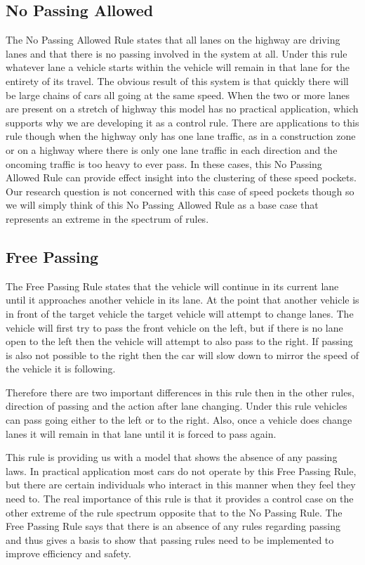 \documentclass{amsart}
\begin{document}
	\subsection{No Passing Allowed}
	The No Passing Allowed Rule states that all lanes on the highway are driving lanes and that there is no passing involved in the system at all.  Under this rule whatever lane a vehicle starts within the vehicle will remain in that lane for the entirety of its travel.  The obvious result of this system is that quickly there will be large chains of cars all going at the same speed.  When the two or more lanes are present on a stretch of highway this model has no practical application, which supports why we are developing it as a control rule.  There are applications to this rule though when the highway only has one lane traffic, as in a construction zone or on a highway where there is only one lane traffic in each direction and the oncoming traffic is too heavy to ever pass.  In these cases, this No Passing Allowed Rule can provide effect insight into the clustering of these speed pockets.  Our research question is not concerned with this case of speed pockets though so we will simply think of this No Passing Allowed Rule as a base case that represents an extreme in the spectrum of rules.  
	\subsection{Free Passing}
	The Free Passing Rule states that the vehicle will continue in its current lane until it approaches another vehicle in its lane.  At the point that another vehicle is in front of the target vehicle the target vehicle will attempt to change lanes.  The vehicle will first try to pass the front vehicle on the left, but if there is no lane open to the left then the vehicle will attempt to also pass to the right.  If passing is also not possible to the right then the car will slow down to mirror the speed of the vehicle it is following. 

	Therefore there are two important differences in this rule then in the other rules, direction of passing and the action after lane changing.  Under this rule vehicles can pass going either to the left or to the right.  Also, once a vehicle does change lanes it will remain in that lane until it is forced to pass again.  

	This rule is providing us with a model that shows the absence of any passing laws.  In practical application most cars do not operate by this Free Passing Rule, but there are certain individuals who interact in this manner when they feel they need to.  The real importance of this rule is that it provides a control case on the other extreme of the rule spectrum opposite that to the No Passing Rule.  The Free Passing Rule says that there is an absence of any rules regarding passing and thus gives a basis to show that passing rules need to be implemented to improve efficiency and safety. 
	
\end{document}

